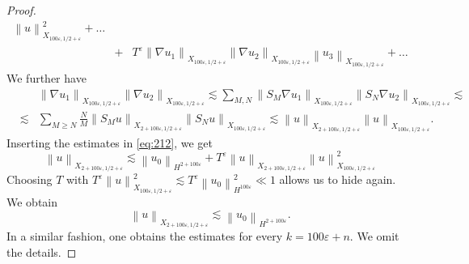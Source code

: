 \documentclass[draft,11pt,leqno]{amsart}
\newcommand{\norm}[2]{{\left\| #1 \right\|}_{#2}}
\newcommand{\ve}{\varepsilon}
\newcommand{\suml}{\sum\limits}
\newcommand{\f}{\displaystyle\frac}
\begin{document}
\begin{proof}
\begin{eqnarray}
\norm{u}{X_{100\ve,1/2+\ve}}^2+ \ldots\\
\nonumber
&+& T^\ve\norm{\nabla u_1}{X_{100\ve,1/2+\ve}}
\norm{\nabla u_2}{X_{100\ve,1/2+\ve}}
\norm{ u_3}{X_{100\ve,1/2+\ve}}+\ldots
\end{eqnarray}
We further have
\begin{eqnarray*}
& &\norm{\nabla u_1}{X_{100\ve,1/2+\ve}}
\norm{\nabla u_2}{X_{100\ve,1/2+\ve}}
\lesssim \suml_{M,N}
 \norm{S_M \nabla u_1}{X_{100\ve,1/2+\ve}}
\norm{S_N \nabla u_2}{X_{100\ve,1/2+\ve}}
 \lesssim \\
&\lesssim& \suml_{M\geq N} 
\f{N}{M}\norm{S_M u}{X_{2+100\ve,1/2+\ve}}
\norm{S_N u}{X_{100\ve,1/2+\ve}}\lesssim 
\norm{u}{X_{2+100\ve,1/2+\ve}}\norm{u}{X_{100\ve,1/2+\ve}}.
\end{eqnarray*}
Inserting the estimates in \eqref{eq:212}, we get
$$
\norm{u}{X_{2+100\ve,1/2+\ve}}\lesssim 
\norm{u_0}{H^{2+100\ve}}+ T^{\ve}\norm{u}{X_{2+100\ve,1/2+\ve}}
\norm{u}{X_{100\ve,1/2+\ve}}^2
$$
Choosing $T$ with $T^{\ve}\norm{u}{X_{100\ve,1/2+\ve}}^2\lesssim 
T^{\ve}\norm{u_0}{H^{100\ve}}^2\ll 1$ allows 
us to hide again. We obtain
$$
\norm{u}{X_{2+100\ve,1/2+\ve}}\lesssim \norm{u_0}{H^{2+100\ve}}.
$$
In a similar fashion, one obtains the estimates for every $k=100\ve+n$. 
We omit the details.
\end{proof}

\vspace{1cm}
\end{document}
